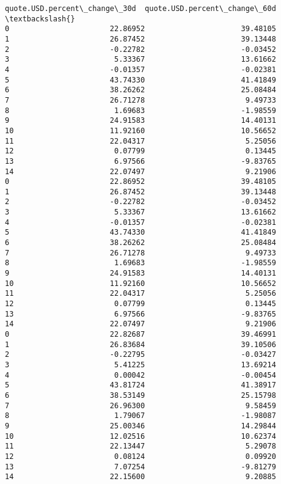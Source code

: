 \documentclass[11pt]{article}
\begin{document}
\begin{tcolorbox}[breakable, size=fbox, boxrule=.5pt, pad at break*=1mm, opacityfill=0]
\begin{Verbatim}[commandchars=\\\{\}]
    quote.USD.percent\_change\_30d  quote.USD.percent\_change\_60d  \textbackslash{}
0                       22.86952                      39.48105
1                       26.87452                      39.13448
2                       -0.22782                      -0.03452
3                        5.33367                      13.61662
4                       -0.01357                      -0.02381
5                       43.74330                      41.41849
6                       38.26262                      25.08484
7                       26.71278                       9.49733
8                        1.69683                      -1.98559
9                       24.91583                      14.40131
10                      11.92160                      10.56652
11                      22.04317                       5.25056
12                       0.07799                       0.13445
13                       6.97566                      -9.83765
14                      22.07497                       9.21906
0                       22.86952                      39.48105
1                       26.87452                      39.13448
2                       -0.22782                      -0.03452
3                        5.33367                      13.61662
4                       -0.01357                      -0.02381
5                       43.74330                      41.41849
6                       38.26262                      25.08484
7                       26.71278                       9.49733
8                        1.69683                      -1.98559
9                       24.91583                      14.40131
10                      11.92160                      10.56652
11                      22.04317                       5.25056
12                       0.07799                       0.13445
13                       6.97566                      -9.83765
14                      22.07497                       9.21906
0                       22.82687                      39.46991
1                       26.83684                      39.10506
2                       -0.22795                      -0.03427
3                        5.41225                      13.69214
4                        0.00042                      -0.00454
5                       43.81724                      41.38917
6                       38.53149                      25.15798
7                       26.96300                       9.58459
8                        1.79067                      -1.98087
9                       25.00346                      14.29844
10                      12.02516                      10.62374
11                      22.13447                       5.29078
12                       0.08124                       0.09920
13                       7.07254                      -9.81279
14                      22.15600                       9.20885


\end{Verbatim}
\end{tcolorbox}
\end{document}
